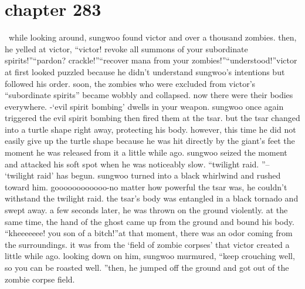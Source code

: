 \section{chapter 283}






 while looking around, sungwoo found victor and over a thousand zombies.
then, he yelled at victor, “victor! revoke all summons of your subordinate spirits!”“pardon? crackle!”“recover mana from your zombies!”“understood!”victor at first looked puzzled because he didn’t understand sungwoo’s intentions but followed his order.
soon, the zombies who were excluded from victor’s “subordinate spirits” became wobbly and collapsed.
 now there were their bodies everywhere.
-‘evil spirit bombing’ dwells in your weapon.
sungwoo once again triggered the evil spirit bombing then fired them at the tsar.
but the tsar changed into a turtle shape right away, protecting his body.
 however, this time he did not easily give up the turtle shape because he was hit directly by the giant’s feet the moment he was released from it a little while ago.
sungwoo seized the moment and attacked his soft spot when he was noticeably slow.
“twilight raid.
”– ‘twilight raid’ has begun.
sungwoo turned into a black whirlwind and rushed toward him.
goooooooooooo-no matter how powerful the tsar was, he couldn’t withstand the twilight raid.
 the tsar’s body was entangled in a black tornado and swept away.
 a few seconds later, he was thrown on the ground violently.
 at the same time, the hand of the ghost came up from the ground and bound his body.
“kheeeeeee! you son of a bitch!”at that moment, there was an odor coming from the surroundings.
 it was from the ‘field of zombie corpses’ that victor created a little while ago.
looking down on him, sungwoo murmured, “keep crouching well, so you can be roasted well.
”then, he jumped off the ground and got out of the zombie corpse field.

